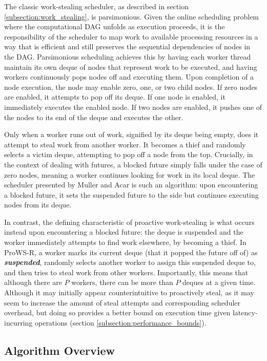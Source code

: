 \documentclass[bsc,frontabs,singlespacing,parskip,deptreport,normalheadings]{infthesis}
\begin{document}
The classic work-stealing scheduler, as described in section
\ref{subsection:work_stealing}, is parsimonious. Given the online scheduling
problem where the computational DAG unfolds as execution proceeds, it is the
responsibility of the scheduler to map work to available processing resources in
a way that is efficient and still preserves the sequential dependencies of nodes
in the DAG. Parsimonious scheduling achieves this by having each worker thread
maintain its own deque of nodes that represent work to be executed, and having
workers continuously pops nodes off and executing them. Upon completion of a
node execution, the node may enable zero, one, or two child nodes. If zero nodes
are enabled, it attempts to pop off its deque. If one node is enabled, it
immediately executes the enabled node. If two nodes are enabled, it pushes one
of the nodes to its end of the deque and executes the other.

Only when a worker runs out of work, signified by its deque being empty, does it
attempt to steal work from another worker. It becomes a thief and randomly
selects a victim deque, attempting to pop off a node from the top. Crucially, in
the context of dealing with futures, a blocked future simply falls under the
case of zero nodes, meaning a worker continues looking for work in its local
deque. The scheduler presented by Muller and Acar
\cite{muller_latency-hiding_2016} is such an algorithm: upon encountering a
blocked future, it sets the suspended future to the side but continues executing
nodes from its deque.

In contrast, the defining characteristic of proactive work-stealing is what
occurs instead upon encountering a blocked future: the deque is suspended and
the worker immediately attempts to find work elsewhere, by becoming a thief. In
ProWS-R, a worker marks its current deque (that it popped the future off of) as
\textbf{\textit{suspended}}, randomly selects another worker to assign this
suspended deque to, and then tries to steal work from other workers.
Importantly, this means that although there are \(P\) workers, there can be more
than \(P\) deques at a given time. Although it may initially appear
counterintuitive to proactively steal, as it may seem to increase the amount of
steal attempts and corresponding scheduler overhead, but doing so provides a
better bound on execution time given latency-incurring operations (section
\ref{subsection:performance_bounds}).

\subsection{Algorithm Overview}
\label{subsection:the_algorithm_in_detail}
\end{document}
